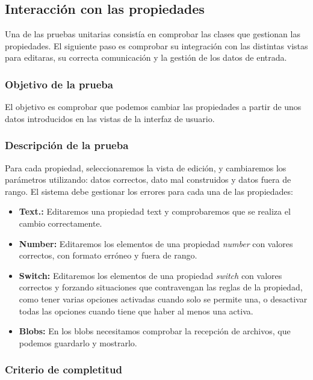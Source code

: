 \subsection{Interacción con las propiedades}

Una de las pruebas unitarias consistía en comprobar las clases que gestionan las propiedades. El siguiente paso es comprobar su integración con las distintas vistas para editaras, su correcta comunicación y la gestión de los datos de entrada.


\subsubsection{Objetivo de la prueba}

El objetivo es comprobar que podemos cambiar las propiedades a partir de unos datos introducidos en las vistas de la interfaz de usuario.

\subsubsection{Descripción de la prueba}

Para cada propiedad, seleccionaremos la vista de edición, y cambiaremos los parámetros utilizando: datos correctos, dato mal construidos y datos fuera de rango. El sistema debe gestionar los errores para cada una de las propiedades:


\begin{itemize}
  \item \textbf{Text.:} Editaremos una propiedad text y comprobaremos que se realiza el cambio correctamente.
  \item \textbf{Number:} Editaremos los elementos de una propiedad \textit{number} con valores correctos, con formato erróneo y fuera de rango.
  \item \textbf{Switch:} Editaremos los elementos de una propiedad \textit{switch} con valores correctos y forzando situaciones que contravengan las reglas de la propiedad, como tener varias opciones activadas cuando solo se permite una, o desactivar todas las opciones cuando tiene que haber al menos una activa.
  \item \textbf{Blobs:} En los blobs necesitamos comprobar la recepción de archivos, que podemos guardarlo y mostrarlo.
\end{itemize}


\subsubsection{Criterio de completitud}

